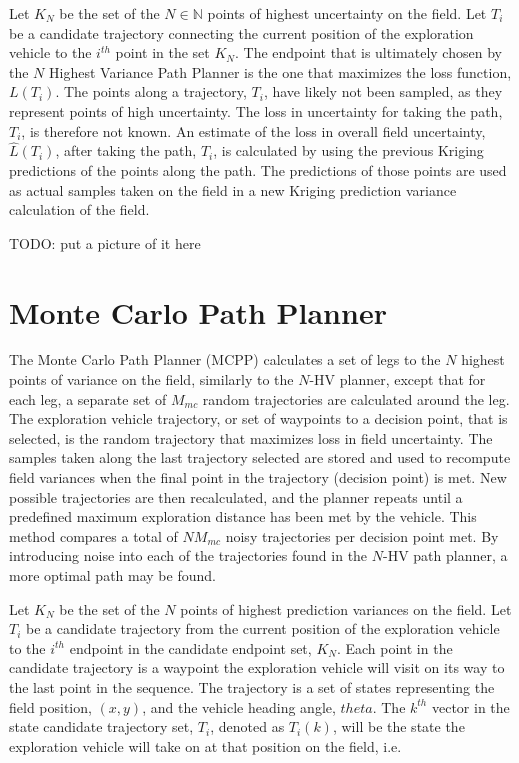 Let $K_N$ be the set of the $N \in \mathbb{N}$ points of highest uncertainty on the field. Let $T_i$ be a candidate trajectory connecting the current position of the exploration vehicle to the $i^{th}$ point in the set $K_N$. The endpoint that is ultimately chosen by the $N$ Highest Variance Path Planner is the one that maximizes the loss function, $L(T_i)$. The points along a trajectory, $T_i$, have likely not been sampled, as they represent points of high uncertainty. The loss in uncertainty for taking the path, $T_i$, is therefore not known. An estimate of the loss in overall field uncertainty, $\hat{L}(T_i)$, after taking the path, $T_i$, is calculated by using the previous Kriging predictions of the points along the path. The predictions of those points are used as actual samples taken on the field in a new Kriging prediction variance calculation of the field.

TODO: put a picture of it here

\section{Monte Carlo Path Planner} \label{sec:mcpp}
The Monte Carlo Path Planner (MCPP) calculates a set of legs to the $N$ highest points of variance on the field, similarly to the $N$-HV planner, except that for each leg, a separate set of $M_{mc}$ random trajectories are calculated around the leg. The exploration vehicle trajectory, or set of waypoints to a decision point, that is selected, is the random trajectory that maximizes loss in field uncertainty. The samples taken along the last trajectory selected are stored and used to recompute field variances when the final point in the trajectory (decision point) is met. New possible trajectories are then recalculated, and the planner repeats until a predefined maximum exploration distance has been met by the vehicle. This method compares a total of $N M_{mc}$ noisy trajectories per decision point met. By introducing noise into each of the trajectories found in the $N$-HV path planner, a more optimal path may be found.

Let $K_N$ be the set of the $N$ points of highest prediction variances on the field. Let $T_i$ be a candidate trajectory from the current position of the exploration vehicle to the $i^{th}$ endpoint in the candidate endpoint set, $K_N$. Each point in the candidate trajectory is a waypoint the exploration vehicle will visit on its way to the last point in the sequence. The trajectory is a set of states representing the field position, $(x,y)$, and the vehicle heading angle, $theta$. The $k^{th}$ vector in the state candidate trajectory set, $T_i$, denoted as $T_{i}(k)$, will be the state the exploration vehicle will take on at that position on the field, i.e.

